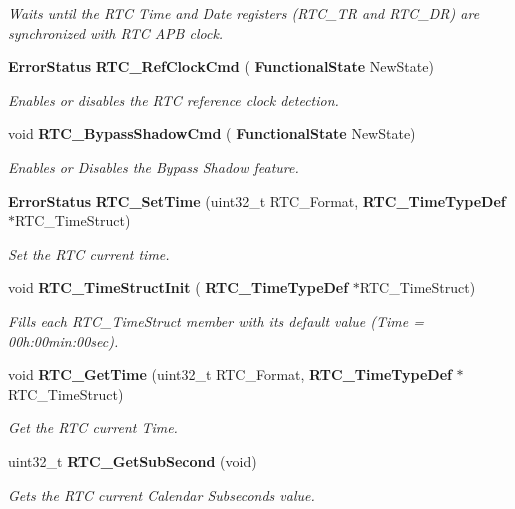 \begin{DoxyCompactItemize}
\begin{DoxyCompactList}\small\item\em Waits until the R\+TC Time and Date registers (R\+T\+C\+\_\+\+TR and R\+T\+C\+\_\+\+DR) are synchronized with R\+TC A\+PB clock. \end{DoxyCompactList}\item 
\textbf{ Error\+Status} \textbf{ R\+T\+C\+\_\+\+Ref\+Clock\+Cmd} (\textbf{ Functional\+State} New\+State)
\begin{DoxyCompactList}\small\item\em Enables or disables the R\+TC reference clock detection. \end{DoxyCompactList}\item 
void \textbf{ R\+T\+C\+\_\+\+Bypass\+Shadow\+Cmd} (\textbf{ Functional\+State} New\+State)
\begin{DoxyCompactList}\small\item\em Enables or Disables the Bypass Shadow feature. \end{DoxyCompactList}\item 
\textbf{ Error\+Status} \textbf{ R\+T\+C\+\_\+\+Set\+Time} (uint32\+\_\+t R\+T\+C\+\_\+\+Format, \textbf{ R\+T\+C\+\_\+\+Time\+Type\+Def} $\ast$R\+T\+C\+\_\+\+Time\+Struct)
\begin{DoxyCompactList}\small\item\em Set the R\+TC current time. \end{DoxyCompactList}\item 
void \textbf{ R\+T\+C\+\_\+\+Time\+Struct\+Init} (\textbf{ R\+T\+C\+\_\+\+Time\+Type\+Def} $\ast$R\+T\+C\+\_\+\+Time\+Struct)
\begin{DoxyCompactList}\small\item\em Fills each R\+T\+C\+\_\+\+Time\+Struct member with its default value (Time = 00h\+:00min\+:00sec). \end{DoxyCompactList}\item 
void \textbf{ R\+T\+C\+\_\+\+Get\+Time} (uint32\+\_\+t R\+T\+C\+\_\+\+Format, \textbf{ R\+T\+C\+\_\+\+Time\+Type\+Def} $\ast$R\+T\+C\+\_\+\+Time\+Struct)
\begin{DoxyCompactList}\small\item\em Get the R\+TC current Time. \end{DoxyCompactList}\item 
uint32\+\_\+t \textbf{ R\+T\+C\+\_\+\+Get\+Sub\+Second} (void)
\begin{DoxyCompactList}\small\item\em Gets the R\+TC current Calendar Subseconds value. \end{DoxyCompactList}\item 

\end{DoxyCompactItemize}
